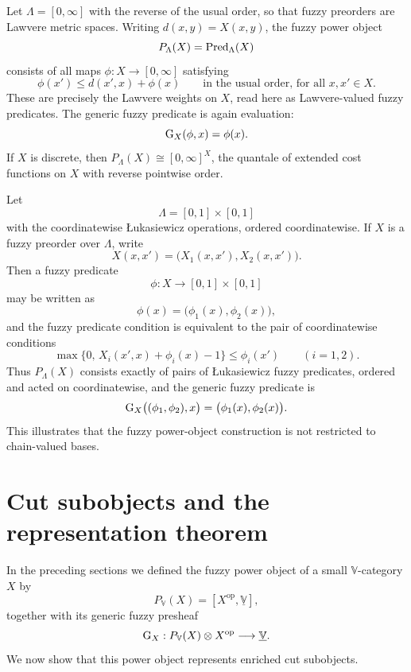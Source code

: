 \begin{example}
\label{ex:lawvere-fuzzy-power-object}
    Let \(\Lambda=[0,\infty]\) with the reverse of the usual order, so that fuzzy preorders are Lawvere metric spaces. Writing \(d(x,y)=X(x,y)\), the fuzzy power object
    \[
        P_\Lambda(X)=\mathrm{Pred}_\Lambda(X)
    \]
    consists of all maps \(\phi:X\to[0,\infty]\) satisfying
    \[
        \phi(x')\leq d(x',x)+\phi(x)
        \qquad
        \text{in the usual order, for all }x,x'\in X.
    \]
    These are precisely the Lawvere weights on \(X\), read here as Lawvere-valued fuzzy predicates. The generic fuzzy predicate is again evaluation:
    \[
        \operatorname{G}_X(\phi,x)=\phi(x).
    \]
    If \(X\) is discrete, then \(P_\Lambda(X)\cong [0,\infty]^X\), the quantale of extended cost functions on \(X\) with reverse pointwise order.
\end{example}

\begin{example}
\label{ex:nonchain-coordinatewise-power-object}
    Let
    \[
        \Lambda=[0,1]\times[0,1]
    \]
    with the coordinatewise {\L}ukasiewicz operations, ordered coordinatewise. If \(X\) is a fuzzy preorder over \(\Lambda\), write
    \[
        X(x,x')=\bigl(X_1(x,x'),X_2(x,x')\bigr).
    \]
    Then a fuzzy predicate
    \[
        \phi:X\to [0,1]\times[0,1]
    \]
    may be written as
    \[
        \phi(x)=\bigl(\phi_1(x),\phi_2(x)\bigr),
    \]
    and the fuzzy predicate condition is equivalent to the pair of coordinatewise conditions
    \[
        \max\{0,\,X_i(x',x)+\phi_i(x)-1\}\leq \phi_i(x')
        \qquad
        (i=1,2).
    \]
    Thus \(P_\Lambda(X)\) consists exactly of pairs of {\L}ukasiewicz fuzzy predicates, ordered and acted on coordinatewise, and the generic fuzzy predicate is
    \[
        \operatorname{G}_X\bigl((\phi_1,\phi_2),x\bigr)
        =
        \bigl(\phi_1(x),\phi_2(x)\bigr).
    \]
    This illustrates that the fuzzy power-object construction is not restricted to chain-valued bases.
\end{example}

\section{Cut subobjects and the representation theorem}
\label{sec:fuzzy-subobjects-and-the-representation-theorem}

In the preceding sections we defined the fuzzy power object of a small \(\mathbb V\)-category \(X\) by
\[
    P_{\mathbb V}(X)
    =
    [X^{\mathrm{op}},\underline{\mathbb V}],
\]
together with its generic fuzzy presheaf
\[
    \operatorname{G}_X:
    P_{\mathbb V}(X)\otimes X^{\mathrm{op}}
    \longrightarrow
    \underline{\mathbb V}.
\]
We now show that this power object represents enriched cut subobjects.

